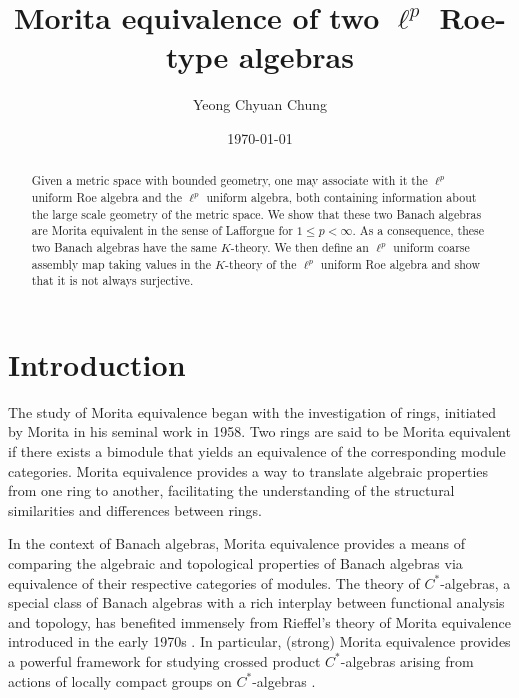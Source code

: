 \documentclass[a4,11pt]{amsart}
\theoremstyle{remark}
\begin{document}
\title{Morita equivalence of two $\ell^p$ Roe-type algebras}
\author{Yeong Chyuan Chung}
\date{\today}
\maketitle

\begin{abstract}
Given a metric space with bounded geometry, one may associate with it the $\ell^p$ uniform Roe algebra and the $\ell^p$ uniform algebra, both containing information about the large scale geometry of the metric space.
We show that these two Banach algebras are Morita equivalent in the sense of Lafforgue for $1\leq p<\infty$.
As a consequence, these two Banach algebras have the same $K$-theory.
We then define an $\ell^p$ uniform coarse assembly map taking values in the $K$-theory of the $\ell^p$ uniform Roe algebra and show that it is not always surjective.
\end{abstract}


\section{Introduction}

The study of Morita equivalence began with the investigation of rings, initiated by Morita in his seminal work \cite{Mor58} in 1958. Two rings are said to be Morita equivalent if there exists a bimodule that yields an equivalence of the corresponding module categories. Morita equivalence provides a way to translate algebraic properties from one ring to another, facilitating the understanding of the structural similarities and differences between rings.

In the context of Banach algebras, Morita equivalence provides a means of comparing the algebraic and topological properties of Banach algebras via equivalence of their respective categories of modules. 
The theory of $C^*$-algebras, a special class of Banach algebras with a rich interplay between functional analysis and topology, has benefited immensely from Rieffel's theory of Morita equivalence introduced in the early 1970s \cite{Rie74,Rie74a,Rie82}. In particular, (strong) Morita equivalence provides a powerful framework for studying crossed product $C^*$-algebras arising from actions of locally compact groups on $C^*$-algebras \cite{Rie76,Rie82a}.
\end{document}
